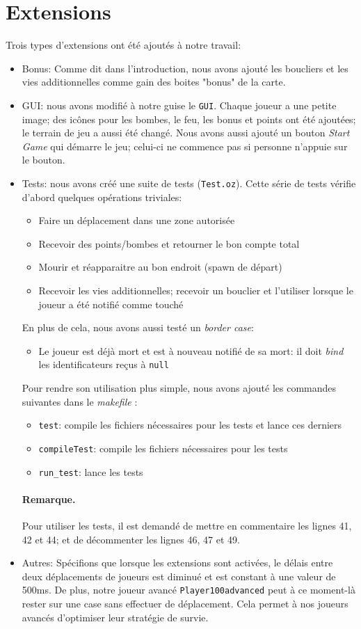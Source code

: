 \documentclass{article}
\begin{document}
\section{Extensions}
Trois types d'extensions ont été ajoutés à notre travail:
\begin{itemize}
	\item Bonus: Comme dit dans l'introduction, nous avons ajouté les boucliers et les vies additionnelles comme gain des boites "bonus" de la carte.
	\item GUI: nous avons modifié à notre guise le \texttt{GUI}. Chaque joueur a une petite image; des icônes pour les bombes, le feu, les bonus et points ont été ajoutées; le terrain de jeu a aussi été changé. Nous avons aussi ajouté un bouton \emph{Start Game} qui démarre le jeu; celui-ci ne commence pas si personne n'appuie sur le bouton. 
	\item Tests: nous avons créé une suite de tests (\texttt{Test.oz}). Cette série de tests vérifie d'abord quelques opérations triviales:
		\begin{itemize}
			\item Faire un déplacement dans une zone autorisée
			\item Recevoir des points/bombes et retourner le bon compte total
			\item Mourir et réapparaitre au bon endroit (spawn de départ)
			\item Recevoir les vies additionnelles; recevoir un bouclier et l'utiliser lorsque le joueur a été notifié comme touché
		\end{itemize}
	En plus de cela, nous avons aussi testé un \emph{border case}:
		\begin{itemize}
			\item Le joueur est déjà mort et est à nouveau notifié de sa mort: il doit \emph{bind} les identificateurs reçus à \texttt{null}
			
		\end{itemize}
	Pour rendre son utilisation plus simple, nous avons ajouté les commandes suivantes dans le \emph{makefile} :
	\begin{itemize}
		\item \texttt{test}: compile les fichiers nécessaires pour les tests et lance ces derniers
		\item \texttt{compileTest}: compile les fichiers nécessaires pour les tests
		\item \texttt{run\_test}: lance les tests
	\end{itemize}
	\paragraph{Remarque.}Pour utiliser les tests, il est demandé de mettre en commentaire les lignes 41, 42 et 44; et de décommenter les lignes 46, 47 et 49.
	\item Autres: Spécifions que lorsque les extensions sont activées, le délais entre deux déplacements de joueurs est diminué et est constant à une valeur de 500ms. De plus, notre joueur avancé \texttt{Player100advanced} peut à ce moment-là rester sur une case sans effectuer de déplacement. Cela permet à nos joueurs avancés d'optimiser leur stratégie de survie.
\end{itemize}
\end{document}
